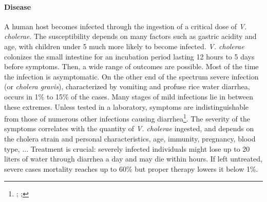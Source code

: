 \paragraph{Disease} A human host becomes infected through the ingestion of a critical dose of \emph{V. cholerae}. The susceptibility depends on many factors such as gastric acidity and age, with children under 5 much more likely to become infected\cite{Sack:Cholera:2004}. \textit{V. cholerae} colonizes the small intestine for an incubation period lasting 12 hours to 5 days\cite{Azman:IncubationPeriodCholera:2013} before symptoms. Then, a wide range of outcomes are possible. Most of the time the infection is asymptomatic. On the other end of the spectrum severe infection (or \emph{cholera gravis}), characterized by vomiting and profuse rice water diarrhea, occurs in 1\% to 15\% of the cases. Many stages of mild infections lie in between these extremes. Unless tested in a laboratory, symptoms are indistinguishable from those of numerous other infections causing diarrhea\footnote{;  ; }.  The severity of the symptoms correlates with the quantity of \textit{V. cholerae} ingested\cite{Brouwer:DoseresponseRelationshipsEnvironmentally:2017}, and depends on the cholera strain and personal characteristics, age, immunity, pregnancy, blood type\cite{WHO:CholeraVaccinesWHO:2017,Azman:IncubationPeriodCholera:2013}, ...%
 Treatment is crucial: severely infected individuals might lose up to 20 liters of water through diarrhea a day and may die within hours. If left untreated, severe cases mortality reaches up to 60\% but proper therapy lowers it below 1\%\cite{Luquero:MortalityRatesCholera:2016}.

